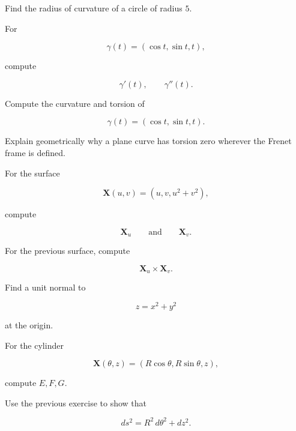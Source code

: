 \begin{exercise}[2]
Find the radius of curvature of a circle of radius \(5\).
\end{exercise}

\begin{exercise}[2]
For

\[
\gamma(t)=(\cos t,\sin t,t),
\]

compute

\[
\gamma'(t),
\qquad
\gamma''(t).
\]
\end{exercise}

\begin{exercise}[3]
Compute the curvature and torsion of

\[
\gamma(t)=(\cos t,\sin t,t).
\]
\end{exercise}

\begin{exercise}[2]
Explain geometrically why a plane curve has torsion zero wherever the
Frenet frame is defined.
\end{exercise}

\begin{exercise}[2]
For the surface

\[
\mathbf{X}(u,v)=(u,v,u^2+v^2),
\]

compute

\[
\mathbf{X}_u
\qquad\text{and}\qquad
\mathbf{X}_v.
\]
\end{exercise}

\begin{exercise}[2]
For the previous surface, compute

\[
\mathbf{X}_u\times\mathbf{X}_v.
\]
\end{exercise}

\begin{exercise}[2]
Find a unit normal to

\[
z=x^2+y^2
\]

at the origin.
\end{exercise}

\begin{exercise}[2]
For the cylinder

\[
\mathbf{X}(\theta,z)
=
(R\cos\theta,R\sin\theta,z),
\]

compute \(E,F,G\).
\end{exercise}

\begin{exercise}[2]
Use the previous exercise to show that

\[
ds^2=R^2\,d\theta^2+dz^2.
\]
\end{exercise}

